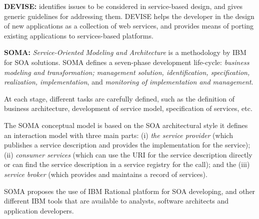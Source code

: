 \bigskip

\textbf{DEVISE:}  \cite{Dhyanesh003} identifies issues to
be considered in service-based design, and gives generic guidelines for
addressing them. DEVISE helps the developer in the design of new applications
as a collection of web services, and provides means of porting existing
applications to services-based platforms.


\bigskip

\textbf{SOMA:} \textit{Service-Oriented Modeling and Architecture} \cite{soma}
is a methodology by IBM for SOA solutions. SOMA defines a seven-phase
development life-cycle: \textit{business modeling and transformation; management
solution, identification, specification, realization, implementation}, and
\textit{monitoring of implementation and management}.

At each stage, different tasks are carefully defined,
such as the definition of business architecture, development of service model,
specification of services, etc. 

% 
% 

The SOMA conceptual model is based on the SOA architectural style it
defines an interaction model with three main parts: (i) \textit{the service
provider} (which publishes a service description and provides the implementation for the
service); (ii) \textit{consumer services} (which can use the URI for the service
description directly or can find the service description in a service registry
for the call); and the (iii) \textit{service broker} (which provides and
maintains a record of services).

SOMA proposes the use of IBM Rational platform for SOA developing, and other
different IBM tools that are available to analysts, software architects and
application developers. 


